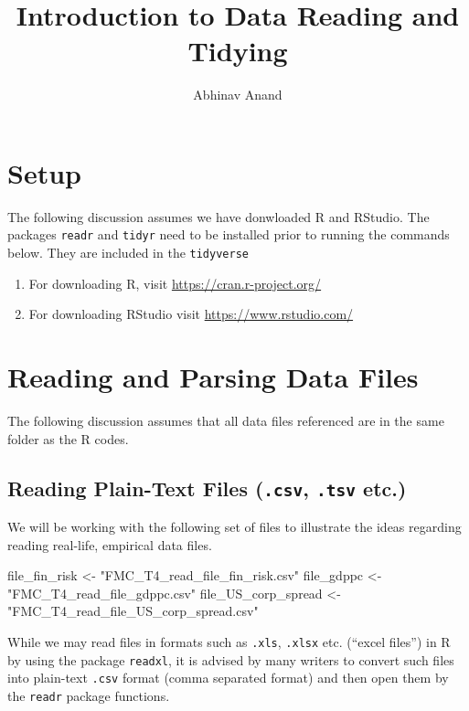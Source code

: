 \documentclass[12pt,]{article}
\title{Introduction to Data Reading and Tidying}
\author{Abhinav Anand}
\date{}
\newenvironment{Shaded}{\begin{snugshade}}{\end{snugshade}}
\newcommand{\StringTok}[1]{\textcolor[rgb]{0.31,0.60,0.02}{#1}}
\newcommand{\NormalTok}[1]{#1}
\providecommand{\tightlist}{%
  \setlength{\itemsep}{0pt}\setlength{\parskip}{0pt}}
\begin{document}
\maketitle

\section{Setup}\label{setup}

The following discussion assumes we have donwloaded R and RStudio. The
packages \texttt{readr} and \texttt{tidyr} need to be installed prior to
running the commands below. They are included in the \texttt{tidyverse}

\begin{enumerate}
\def\labelenumi{\arabic{enumi}.}
\tightlist
\item
  For downloading R, visit \url{https://cran.r-project.org/}
\item
  For downloading RStudio visit \url{https://www.rstudio.com/}
\end{enumerate}

\section{Reading and Parsing Data
Files}\label{reading-and-parsing-data-files}

The following discussion assumes that all data files referenced are in
the same folder as the R codes.

\subsection{\texorpdfstring{Reading Plain-Text Files (\texttt{.csv},
\texttt{.tsv}
etc.)}{Reading Plain-Text Files (.csv, .tsv etc.)}}\label{reading-plain-text-files-.csv-.tsv-etc.}

We will be working with the following set of files to illustrate the
ideas regarding reading real-life, empirical data files.

\begin{Shaded}
\begin{Highlighting}[]
\NormalTok{file_fin_risk <-}\StringTok{ "FMC_T4_read_file_fin_risk.csv"}
\NormalTok{file_gdppc <-}\StringTok{ "FMC_T4_read_file_gdppc.csv"}
\NormalTok{file_US_corp_spread <-}\StringTok{ "FMC_T4_read_file_US_corp_spread.csv"}
\end{Highlighting}
\end{Shaded}

While we may read files in formats such as \texttt{.xls}, \texttt{.xlsx}
etc. (``excel files'') in R by using the package \texttt{readxl}, it is
advised by many writers to convert such files into plain-text
\texttt{.csv} format (comma separated format) and then open them by the
\texttt{readr} package functions.
\end{document}
